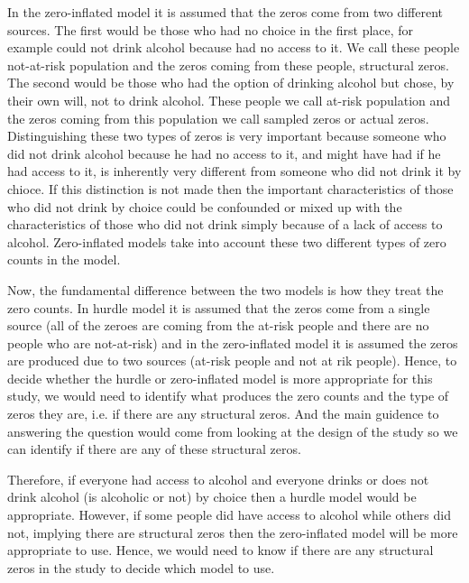 \documentclass{article}\usepackage[]{graphicx}\usepackage[]{color}
\begin{document}
\vspace{5mm}

In the zero-inflated model it is assumed that the zeros come from two different sources. The first would be those who had no choice in the first place, for example could not drink alcohol because had no access to it. We call these people not-at-risk population and the zeros coming from these people, structural zeros. The second would be those who had the option of drinking alcohol but chose, by their own will, not to drink alcohol. These people we call at-risk population and the zeros coming from this population we call sampled zeros or actual zeros. Distinguishing these two types of zeros is very important because someone who did not drink alcohol because he had no access to it, and might have had if he had access to it, is inherently very different from someone who did not drink it by chioce. If this distinction is not made then the important characteristics of those who did not drink by choice could be confounded or mixed up with the characteristics of those who did not drink simply because of a lack of access to alcohol. Zero-inflated models take into account these two different types of zero counts in the model. 


\vspace{5mm}

Now, the fundamental difference between the two models is how they treat the zero counts. In hurdle model it is assumed that the zeros come from a single source (all of the zeroes are coming from the at-risk people and there are no people who are not-at-risk) and in the zero-inflated model it is assumed the zeros are produced due to two sources (at-risk people and not at rik people). Hence, to decide whether the hurdle or zero-inflated model is more appropriate for this study, we would need to identify what produces the zero counts and the type of zeros they are, i.e. if there are any structural zeros. And the main guidence to answering the question would come from looking at the design of the study so we can identify if there are any of these structural zeros. 

\vspace{5mm}

Therefore, if everyone had access to alcohol and everyone drinks or does not drink alcohol (is alcoholic or not) by choice then a hurdle model would be appropriate. However, if some people did have access to alcohol while others did not, implying there are structural zeros then the zero-inflated model will be more appropriate to use. Hence, we would need to know if there are any structural zeros in the study to decide which model to use. 


 
\end{document}
